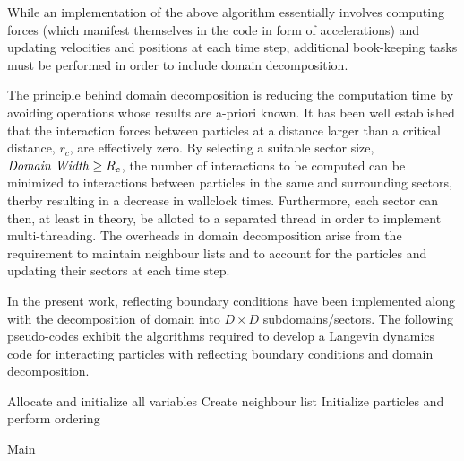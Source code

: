 \documentclass[11pt, oneside]{article}
\begin{document}
While an implementation of the above algorithm essentially involves computing forces (which manifest themselves in the code in form of accelerations) and updating velocities and positions at each time step, additional book-keeping tasks must be performed in order to include domain decomposition.

The principle behind domain decomposition is reducing the computation time by avoiding operations whose results are a-priori known. It has been well established that the interaction forces between particles at a distance larger than a critical distance, $r_c$, are effectively zero. By selecting a suitable sector size, $\text{\textit{Domain Width}} \geq R_c$, the number of interactions to be computed can be minimized to interactions between particles in the same and surrounding sectors, therby resulting in a decrease in wallclock times. Furthermore, each sector can then, at least in theory, be alloted to a separated thread in order to implement multi-threading. The overheads in domain decomposition arise from the requirement to maintain neighbour lists and to account for the particles and updating their sectors at each time step.

In the present work, reflecting boundary conditions have been implemented along with the decomposition of domain into $D \times D$ subdomains/sectors. The following pseudo-codes exhibit the algorithms required to develop a Langevin dynamics code for interacting particles with reflecting boundary conditions and domain decomposition.

% 
\begin{algorithm}
  \DontPrintSemicolon
  Allocate and initialize all variables\;
  Create neighbour list\;
  Initialize particles and perform ordering\;
  \caption{Main}
\end{algorithm}
\end{document}
